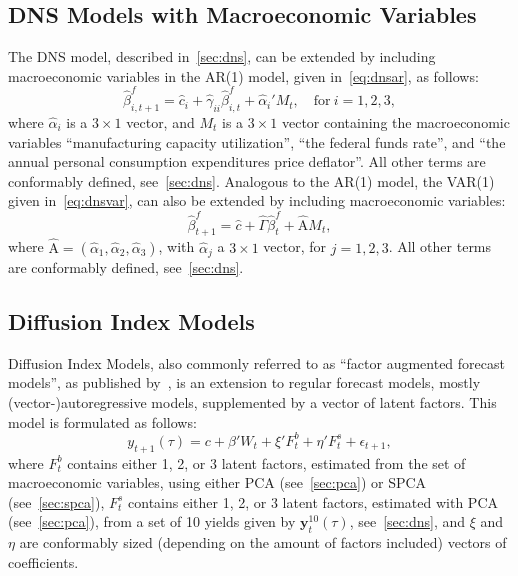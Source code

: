 \subsection{DNS Models with Macroeconomic Variables}
\label{sec:dnsmv}
The DNS model, described in~\cref{sec:dns}, can be extended by including macroeconomic variables in the AR(1) model, given in~\cref{eq:dnsar}, as follows:
\begin{equation}
	\hat{\beta}_{i,t+1}^{f} = \hat{c}_i + \hat{\gamma}_{ii} \hat{\beta}_{i,t}^f + \hat{\alpha}_i' M_t, \quad \text{for}~i = 1,2,3,
\end{equation}
where $\hat{\alpha}_i$ is a $3 \times 1$ vector, and $M_t$ is a $3 \times 1$ vector containing the macroeconomic variables \enquote{manufacturing capacity utilization}, \enquote{the federal funds rate}, and \enquote{the annual personal consumption expenditures price deflator}. All other terms are conformably defined, see~\cref{sec:dns}. Analogous to the AR(1) model, the VAR(1) given in~\cref{eq:dnsvar}, can also be extended by including macroeconomic variables:
\begin{equation}
	\hat{\beta}_{t+1}^{f} = \hat{c} + \hat{\Gamma} \hat{\beta}_t^f + \hat{\mathrm{A}} M_t,
\end{equation}
where $\hat{\mathrm{A}} = \left(\hat{\alpha}_1, \hat{\alpha}_2, \hat{\alpha}_3 \right)$, with $\hat{\alpha}_j$ a $3 \times 1$ vector, for $j = 1,2,3$. All other terms are conformably defined, see~\cref{sec:dns}.

\subsection{Diffusion Index Models}
\label{sec:dif}
Diffusion Index Models, also commonly referred to as \enquote{factor augmented forecast models}, as published by~\textcite[hereafter DIF]{Stock2002a,Stock2002b}, is an extension to regular forecast models, mostly (vector-)autoregressive models, supplemented by a vector of latent factors. This model is formulated as follows:
\begin{equation}
	y_{t+1}(\tau) = c + \beta' W_t + \xi' F_t^b + \eta' F_t^s + \epsilon_{t+1},
\end{equation}
where $F_t^b$ contains either 1, 2, or 3 latent factors, estimated from the set of macroeconomic variables, using either PCA (see~\cref{sec:pca}) or SPCA (see~\cref{sec:spca}), $F_t^s$ contains either 1, 2, or 3 latent factors, estimated with PCA (see~\cref{sec:pca}), from a set of 10 yields given by $\mathbf{y}_t^{10}(\tau)$, see~\cref{sec:dns}, and $\xi$ and $\eta$ are conformably sized (depending on the amount of factors included) vectors of coefficients. 

